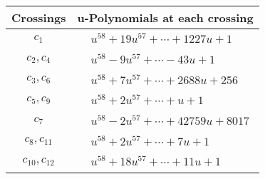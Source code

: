 \documentclass[1p]{elsarticle_modified}
\theoremstyle{definition}
\begin{document}
\begin{tabular}{m{50pt}|m{274pt}}
Crossings & \hspace{64pt}u-Polynomials at each crossing \\
\hline $$\begin{aligned}c_{1}\end{aligned}$$&$\begin{aligned}
&u^{58}+19 u^{57}+\cdots+1227 u+1
\end{aligned}$\\
\hline $$\begin{aligned}c_{2},c_{4}\end{aligned}$$&$\begin{aligned}
&u^{58}-9 u^{57}+\cdots-43 u+1
\end{aligned}$\\
\hline $$\begin{aligned}c_{3},c_{6}\end{aligned}$$&$\begin{aligned}
&u^{58}+7 u^{57}+\cdots+2688 u+256
\end{aligned}$\\
\hline $$\begin{aligned}c_{5},c_{9}\end{aligned}$$&$\begin{aligned}
&u^{58}+2 u^{57}+\cdots+u+1
\end{aligned}$\\
\hline $$\begin{aligned}c_{7}\end{aligned}$$&$\begin{aligned}
&u^{58}-2 u^{57}+\cdots+42759 u+8017
\end{aligned}$\\
\hline $$\begin{aligned}c_{8},c_{11}\end{aligned}$$&$\begin{aligned}
&u^{58}+2 u^{57}+\cdots+7 u+1
\end{aligned}$\\
\hline $$\begin{aligned}c_{10},c_{12}\end{aligned}$$&$\begin{aligned}
&u^{58}+18 u^{57}+\cdots+11 u+1
\end{aligned}$\\
\hline
\end{tabular}\\~\\
\newpage\renewcommand{\arraystretch}{1}
\end{document}
